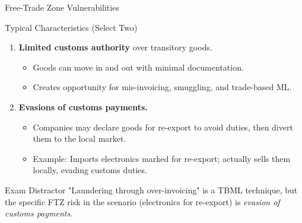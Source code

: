 \documentclass{beamer}
\begin{document}
	\begin{frame}{Free-Trade Zone Vulnerabilities}
		\begin{block}{Typical Characteristics (Select Two)}
			\begin{enumerate}
				\item \textbf{Limited customs authority} over transitory goods.
				\begin{itemize}
					\item Goods can move in and out with minimal documentation.
					\item Creates opportunity for mis-invoicing, smuggling, and trade-based ML.
				\end{itemize}
				\item \textbf{Evasions of customs payments.}
				\begin{itemize}
					\item Companies may declare goods for re-export to avoid duties, then divert them to the local market.
					\item Example: Imports electronics marked for re-export; actually sells them locally, evading customs duties.
				\end{itemize}
			\end{enumerate}
		\end{block}
		\begin{alertblock}{Exam Distractor}
			"Laundering through over-invoicing" is a TBML technique, but the specific FTZ risk in the scenario (electronics for re-export) is \textit{evasion of customs payments}.
		\end{alertblock}
	\end{frame}
	
\end{document}
